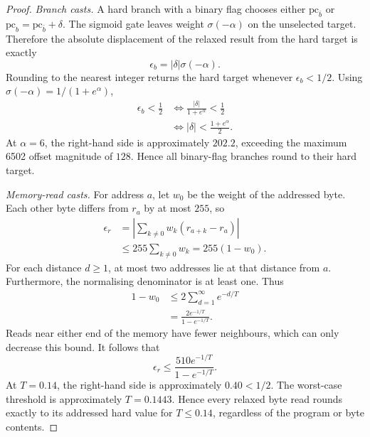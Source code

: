 \documentclass[letterpaper]{article} %
\begin{document}
\begin{proof}
\textit{Branch casts.}
A hard branch with a binary flag chooses either
$\mathrm{pc}_{\bar b}$ or
$\mathrm{pc}_{b}=\mathrm{pc}_{\bar b}+\delta$.
The sigmoid gate leaves weight
$\sigma(-\alpha)$ on the unselected target.
Therefore the absolute displacement of the
relaxed result from the hard target is exactly
\begin{equation}
\epsilon_b=|\delta|\sigma(-\alpha).
\end{equation}
Rounding to the nearest integer returns the
hard target whenever $\epsilon_b<1/2$.
Using
$\sigma(-\alpha)=1/(1+e^\alpha)$,
\begin{equation}
\begin{aligned}
\epsilon_b<\frac12
&\Longleftrightarrow
\frac{|\delta|}{1+e^\alpha}<\frac12\\
&\Longleftrightarrow
|\delta|<\frac{1+e^\alpha}{2}.
\end{aligned}
\end{equation}
At $\alpha=6$, the right-hand side is
approximately $202.2$, exceeding the maximum
6502 offset magnitude of $128$. Hence all
binary-flag branches round to their hard target.

\textit{Memory-read casts.}
For address $a$, let $w_0$ be the weight of
the addressed byte. Each other byte differs
from $r_a$ by at most $255$, so
\begin{equation}
\begin{aligned}
\epsilon_r
&=\left|\sum_{k\ne0}w_k(r_{a+k}-r_a)\right|\\
&\le255\sum_{k\ne0}w_k
=255(1-w_0).
\end{aligned}
\end{equation}
For each distance $d\ge1$, at most two
addresses lie at that distance from $a$.
Furthermore, the normalising denominator is
at least one. Thus
\begin{equation}
\begin{aligned}
1-w_0
&\le2\sum_{d=1}^{\infty}e^{-d/T}\\
&=\frac{2e^{-1/T}}{1-e^{-1/T}}.
\end{aligned}
\end{equation}
Reads near either end of the memory have fewer
neighbours, which can only decrease this bound.
It follows that
\begin{equation}
\epsilon_r
\le\frac{510e^{-1/T}}{1-e^{-1/T}}.
\end{equation}
At $T=0.14$, the right-hand side is
approximately $0.40<1/2$. The worst-case
threshold is approximately $T=0.1443$.
Hence every relaxed byte read rounds exactly
to its addressed hard value for $T\le0.14$,
regardless of the program or byte contents.


\end{proof}
\end{document}
